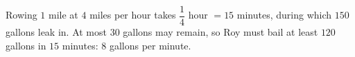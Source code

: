 Rowing $1$ mile at $4$ miles per hour takes $\dfrac14$ hour $=15$ minutes, during which $150$ gallons leak in. At most $30$ gallons may remain, so Roy must bail at least $120$ gallons in $15$ minutes: $\boxed{8}$ gallons per minute.
